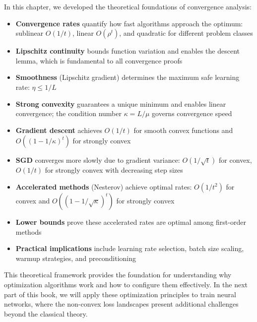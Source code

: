 \documentclass[../../main.tex]{subfiles}
\begin{document}
In this chapter, we developed the theoretical foundations of convergence analysis:

\begin{itemize}
    \item \textbf{Convergence rates} quantify how fast algorithms approach the optimum: sublinear $O(1/t)$, linear $O(\rho^t)$, and quadratic for different problem classes

    \item \textbf{Lipschitz continuity} bounds function variation and enables the descent lemma, which is fundamental to all convergence proofs

    \item \textbf{Smoothness} (Lipschitz gradient) determines the maximum safe learning rate: $\eta \leq 1/L$

    \item \textbf{Strong convexity} guarantees a unique minimum and enables linear convergence; the condition number $\kappa = L/\mu$ governs convergence speed

    \item \textbf{Gradient descent} achieves $O(1/t)$ for smooth convex functions and $O((1-1/\kappa)^t)$ for strongly convex

    \item \textbf{SGD} converges more slowly due to gradient variance: $O(1/\sqrt{t})$ for convex, $O(1/t)$ for strongly convex with decreasing step sizes

    \item \textbf{Accelerated methods} (Nesterov) achieve optimal rates: $O(1/t^2)$ for convex and $O((1-1/\sqrt{\kappa})^t)$ for strongly convex

    \item \textbf{Lower bounds} prove these accelerated rates are optimal among first-order methods

    \item \textbf{Practical implications} include learning rate selection, batch size scaling, warmup strategies, and preconditioning
\end{itemize}

This theoretical framework provides the foundation for understanding why optimization algorithms work and how to configure them effectively. In the next part of this book, we will apply these optimization principles to train neural networks, where the non-convex loss landscapes present additional challenges beyond the classical theory.
\end{document}
